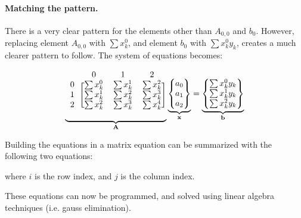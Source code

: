 \documentclass{../../KDHnotes}
\begin{document}
\paragraph{Matching the pattern.}
There is a very clear pattern for the elements other than $A_{0,0}$ and $b_0$. However, replacing element $A_{0,0}$ with $\sum x_k^0$, and element $b_0$ with $\sum x_k^0y_k$, creates a much clearer pattern to follow. The system of equations becomes:

\begin{equation}
\underbrace{
	\begin{blockarray}{cccc}
	& 0 & 1 & 2\\
	\begin{block}{c[ccc]}
	0 & \sum x_k^0 & \sum x_k^1 & \sum x_k^2\\
	1 & \sum x_k^1 & \sum x_k^2 & \sum x_k^3\\
	2 & \sum x_k^2 & \sum x_k^3 & \sum x_k^4\\
	\end{block}
	\end{blockarray}
}_{\vec{A}}
\underbrace{
	\begin{Bmatrix}
		a_0\\ a_1\\ a_2
	\end{Bmatrix}
}_{\vec{x}}
	=
\underbrace{
	\begin{Bmatrix}
		\sum x_k^0 y_k\\ 
		\sum x_k^1 y_k\\
		\sum x_k^2 y_k
	\end{Bmatrix}
}_{\vec{b}}
\end{equation}



Building the equations in a matrix equation can be summarized with the following two equations:


where $i$ is the row index, and $j$ is the column index.


These equations can now be programmed, and solved using linear algebra techniques (i.e. gauss elimination).


\nocite{NumMethods}
\nocite{holisticnumericalmethods}

\newpage



\end{document}
